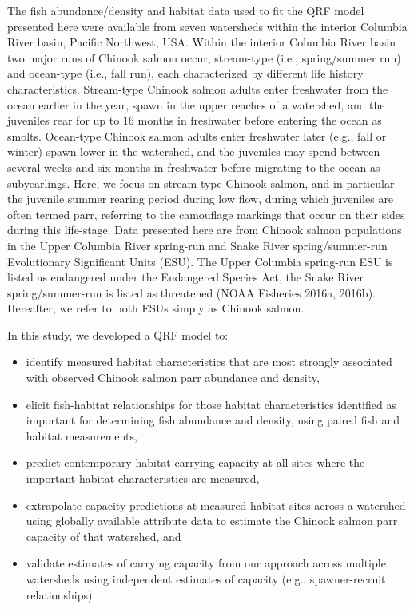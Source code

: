 \documentclass[
  12pt,
]{article}
\providecommand{\tightlist}{%
  \setlength{\itemsep}{0pt}\setlength{\parskip}{0pt}}
\begin{document}
The fish abundance/density and habitat data used to fit the QRF model presented here were available from seven watersheds within the interior Columbia River basin, Pacific Northwest, USA. Within the interior Columbia River basin two major runs of Chinook salmon occur, stream-type (i.e., spring/summer run) and ocean-type (i.e., fall run), each characterized by different life history characteristics. Stream-type Chinook salmon adults enter freshwater from the ocean earlier in the year, spawn in the upper reaches of a watershed, and the juveniles rear for up to 16 months in freshwater before entering the ocean as smolts. Ocean-type Chinook salmon adults enter freshwater later (e.g., fall or winter) spawn lower in the watershed, and the juveniles may spend between several weeks and six months in freshwater before migrating to the ocean as subyearlings. Here, we focus on stream-type Chinook salmon, and in particular the juvenile summer rearing period during low flow, during which juveniles are often termed parr, referring to the camouflage markings that occur on their sides during this life-stage. Data presented here are from Chinook salmon populations in the Upper Columbia River spring-run and Snake River spring/summer-run Evolutionary Significant Units (ESU). The Upper Columbia spring-run ESU is listed as endangered under the Endangered Species Act, the Snake River spring/summer-run is listed as threatened (NOAA Fisheries 2016a, 2016b). Hereafter, we refer to both ESUs simply as Chinook salmon.

In this study, we developed a QRF model to:

\begin{itemize}
\tightlist
\item
  identify measured habitat characteristics that are most strongly associated with observed Chinook salmon parr abundance and density,
\item
  elicit fish-habitat relationships for those habitat characteristics identified as important for determining fish abundance and density, using paired fish and habitat measurements,
\item
  predict contemporary habitat carrying capacity at all sites where the important habitat characteristics are measured,
\item
  extrapolate capacity predictions at measured habitat sites across a watershed using globally available attribute data to estimate the Chinook salmon parr capacity of that watershed, and
\item
  validate estimates of carrying capacity from our approach across multiple watersheds using independent estimates of capacity (e.g., spawner-recruit relationships).
\end{itemize}
\end{document}
